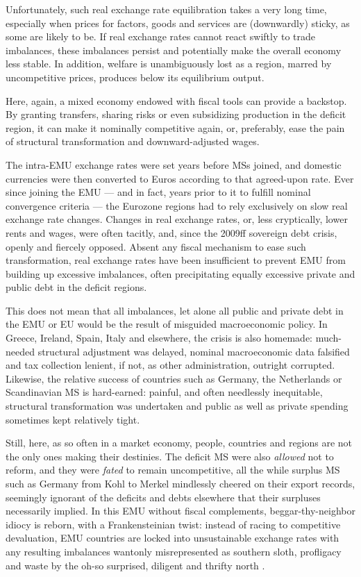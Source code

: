 \documentclass[11pt,a4paper,oneside]{article}
\begin{document}
Unfortunately, such real exchange rate equilibration takes a very long time, especially when prices for factors, goods and services are (downwardly) sticky, as some are likely to be. 
If real exchange rates cannot react swiftly to trade imbalances, these imbalances persist and potentially make the overall economy less stable. 
In addition, welfare is unambiguously lost as a region, marred by uncompetitive prices, produces below its equilibrium output.

Here, again, a mixed economy endowed with fiscal tools can provide a backstop.~
By granting transfers, sharing risks or even subsidizing production in the deficit region, it can make it nominally competitive again, or, preferably, ease the pain of structural transformation and downward-adjusted wages. 

The intra-\gls{EMU} exchange rates were set years before \glspl{MS} joined, and domestic currencies were then converted to Euros according to that agreed-upon rate. 
Ever since joining the \gls{EMU} --- and in fact, years prior to it to fulfill nominal convergence criteria --- the Eurozone regions had to rely exclusively on slow real exchange rate changes. 
Changes in real exchange rates, or, less cryptically, lower rents and wages, were often tacitly, and, since the 2009ff sovereign debt crisis, openly and fiercely opposed. 
Absent any fiscal mechanism to ease such transformation, real exchange rates have been insufficient to prevent \gls{EMU} from building up excessive imbalances, often precipitating equally excessive private and public debt in the deficit regions. 

This does not mean that all imbalances, let alone all public and private debt in the \gls{EMU} or \gls{EU} would be the result of misguided macroeconomic policy. 
In Greece, Ireland, Spain, Italy and elsewhere, the crisis is also homemade: 
much-needed structural adjustment was delayed, nominal macroeconomic data falsified and tax collection lenient, if not, as other administration, outright corrupted. 
Likewise, the relative success of countries such as Germany, the Netherlands or Scandinavian \gls{MS} is hard-earned: 
painful, and often needlessly inequitable, structural transformation was undertaken and public as well as private spending sometimes kept relatively tight.

Still, here, as so often in a market economy, people, countries and regions are not the only ones making their destinies. 
The deficit \gls{MS} were also \emph{allowed} not to reform, and they were \emph{fated} to remain uncompetitive, all the while surplus \gls{MS} such as Germany from Kohl to Merkel mindlessly cheered on their export records, seemingly ignorant of the deficits and debts elsewhere that their surpluses necessarily implied. 
In this \gls{EMU} without fiscal complements, beggar-thy-neighbor idiocy is reborn, with a Frankensteinian twist: 
instead of racing to competitive devaluation, \gls{EMU} countries are locked into unsustainable exchange rates with any resulting imbalances wantonly misrepresented as southern sloth, profligacy and waste by the oh-so surprised, diligent and thrifty north \citep[e.g.][200]{Featherstone2011}.
\end{document}
